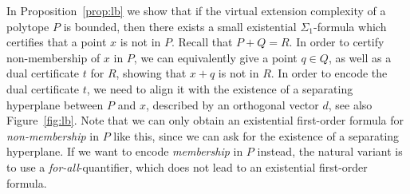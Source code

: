 \documentclass[centering,11pt,reqno]{amsart}
\theoremstyle{definition}
\begin{document}
In Proposition~\ref{prop:lb} we show that if the virtual extension complexity of a polytope $P$ is bounded, then there exists a small existential $\Sigma_1$-formula which certifies that a point $x$ is not in $P$. 
Recall that $P+Q=R$.
In order to certify non-membership of $x$ in $P$, we can equivalently give a point $q\in Q$, as well as a dual certificate $t$ for $R$, showing that $x+q$ is not in $R$.
In order to encode the dual certificate $t$, we need to align it with the existence of a separating hyperplane between $P$ and $x$, described by an orthogonal vector $d$, see also Figure~\ref{fig:lb}.
Note that we can only obtain an existential first-order formula for \emph{non-membership} in $P$ like this, since we can ask for the existence of a separating hyperplane.
If we want to encode \emph{membership} in $P$ instead, the natural variant is to use a \emph{for-all}-quantifier, which does not lead to an existential first-order formula.
\end{document}
